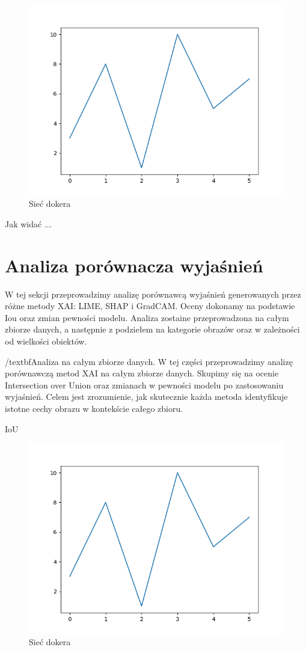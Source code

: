 \begin{figure}
  \centering\includegraphics[width=.6\textwidth]{images/example}
\caption{Sieć dokera \cite{docker_compose_reference}}  \label{rys:network}
\end{figure}

Jak widać ...

\section*{Analiza porównacza wyjaśnień}
W tej sekcji przeprowadzimy analizę porównawcą wyjaśnień generowanych przez różne metody XAI: LIME, SHAP i GradCAM.
Oceny dokonamy na podstawie Iou oraz zmian pewności modelu.
Analiza zostaine przeprowadzona na całym zbiorze danych, a następnie z podziełem na kategorie obrazów oraz w zależności od wielkości obiektów.

/textbf{Analiza na całym zbiorze danych}.
W tej części przeprowadzimy analizę porównawczą metod XAI na całym zbiorze danych.
Skupimy się na ocenie Intersection over Union oraz zmianach w pewności modelu po zastosowaniu wyjaśnień. Celem jest zrozumienie, jak skutecznie każda metoda identyfikuje istotne cechy obrazu w kontekście całego zbioru.

IoU
\begin{figure}
  \centering\includegraphics[width=.6\textwidth]{images/example}
\caption{Sieć dokera \cite{docker_compose_reference}}  \label{rys:network}
\end{figure}


